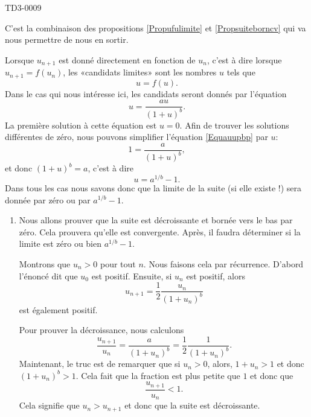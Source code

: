 
\begin{corrige}{TD3-0009}

	C'est la combinaison des propositions \ref{Propufulimite} et \ref{Propsuiteborncv} qui va nous permettre de nous en sortir.

	Lorsque $u_{n+1}$ est donné directement en fonction de $u_n$, c'est à dire lorsque $u_{n+1}=f(u_n)$, les «candidats limites» sont les nombres $u$ tels que
	\begin{equation}
		u=f(u).
	\end{equation}
	Dans le cas qui nous intéresse ici, les candidats seront donnés par l'équation
	\begin{equation}		\label{Equauupbp}
		u=\frac{ au }{ (1+u)^b }.
	\end{equation}
	La première solution à cette équation est $u=0$. Afin de trouver les solutions différentes de zéro, nous pouvons simplifier l'équation \eqref{Equauupbp} par $u$:
	\begin{equation}
		1=\frac{ a }{ (1+u)^b },
	\end{equation}
	et donc $(1+u)^b=a$, c'est à dire
	\begin{equation}
		u=a^{1/b}-1.
	\end{equation}
	Dans tous les cas nous savons donc que la limite de la suite (si elle existe !) sera donnée par zéro ou par $a^{1/b}-1$.

	\begin{enumerate}
		\item
			Nous allons prouver que la suite est décroissante et bornée vers le bas par zéro. Cela prouvera qu'elle est convergente. Après, il faudra déterminer si la limite est zéro ou bien $a^{1/b}-1$.

			Montrons que $u_n>0$ pour tout $n$. Nous faisons cela par récurrence. D'abord l'énoncé dit que $u_0$ est positif. Ensuite, si $u_n$ est positif, alors
			\begin{equation}
				u_{n+1}=\frac{ 1 }{2}\frac{ u_n }{ (1+u_n)^b }
			\end{equation}
			est également positif.

			Pour prouver la décroissance, nous calculons
			\begin{equation}
				\frac{ u_{n+1} }{ u_n }=\frac{ a }{ (1+u_n)^b }=\frac{ 1 }{2}\frac{ 1 }{ (1+u_n)^b }.
			\end{equation}
			Maintenant, le truc est de remarquer que si $u_n>0$, alors, $1+u_n>1$ et donc $(1+u_n)^b>1$. Cela fait que la fraction est plus petite que $1$ et donc que
			\begin{equation}
				\frac{ u_{n+1} }{ u_n }<1.
			\end{equation}
			Cela signifie que $u_n>u_{n+1}$ et donc que la suite est décroissante.


\end{enumerate}
\end{corrige}
